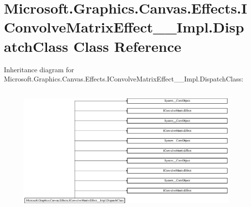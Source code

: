 \hypertarget{class_microsoft_1_1_graphics_1_1_canvas_1_1_effects_1_1_i_convolve_matrix_effect_____impl_1_1_dispatch_class}{}\section{Microsoft.\+Graphics.\+Canvas.\+Effects.\+I\+Convolve\+Matrix\+Effect\+\_\+\+\_\+\+Impl.\+Dispatch\+Class Class Reference}
\label{class_microsoft_1_1_graphics_1_1_canvas_1_1_effects_1_1_i_convolve_matrix_effect_____impl_1_1_dispatch_class}
Inheritance diagram for Microsoft.\+Graphics.\+Canvas.\+Effects.\+I\+Convolve\+Matrix\+Effect\+\_\+\+\_\+\+Impl.\+Dispatch\+Class\+:\begin{figure}[H]
\begin{center}
\leavevmode
\includegraphics[height=6.595289cm]{class_microsoft_1_1_graphics_1_1_canvas_1_1_effects_1_1_i_convolve_matrix_effect_____impl_1_1_dispatch_class}
\end{center}
\end{figure}
